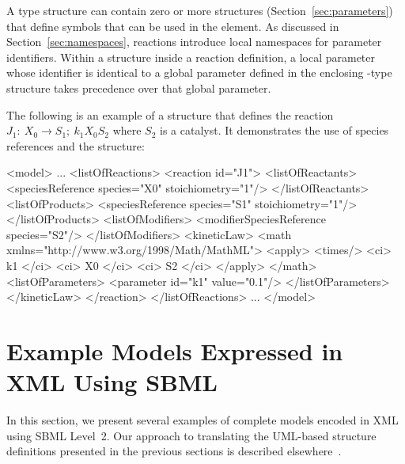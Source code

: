 \documentclass[10pt,twocolumntoc]{cekarticle}
\begin{document}
A  type structure can contain zero or more
 structures (Section~\ref{sec:parameters}) that
define symbols that can be used in the  element.  As
discussed in Section~\ref{sec:namespaces}, reactions introduce
local namespaces for parameter identifiers.  Within a
 structure inside a reaction definition, a local
parameter whose identifier is identical to a global parameter
defined in the enclosing -type structure takes
precedence over that global parameter.

The following is an example of a  structure that
defines the reaction $J_1: \ X_0 \longrightarrow S_1; \ k_1 X_0
S_2$ where $S_2$ is a catalyst. It demonstrates the use of species
references and the  structure:
\begin{example}
<model>
    ...
    <listOfReactions>
        <reaction id="J1">
            <listOfReactants>
                <speciesReference species="X0" stoichiometry="1"/>
            </listOfReactants>
            <listOfProducts>
                <speciesReference species="S1" stoichiometry="1"/>
            </listOfProducts>
            <listOfModifiers>
                <modifierSpeciesReference species="S2"/>
            </listOfModifiers>
            <kineticLaw>
                <math xmlns="http://www.w3.org/1998/Math/MathML">
                    <apply>
                        <times/>
                        <ci> k1 </ci>
                        <ci> X0 </ci>
                        <ci> S2 </ci>
                    </apply>
                </math>
                <listOfParameters>
                    <parameter id="k1" value="0.1"/>
                </listOfParameters>
            </kineticLaw>
        </reaction>
    </listOfReactions>
    ...
</model>
\end{example}

\section{Example Models Expressed in XML Using SBML}
\label{sec:xml-rep}

In this section, we present several examples of complete models
encoded in XML using SBML Level~2.  Our approach to translating
the UML-based structure definitions presented in the previous
sections is described elsewhere~\citep{hucka:2000b}.
\end{document}
